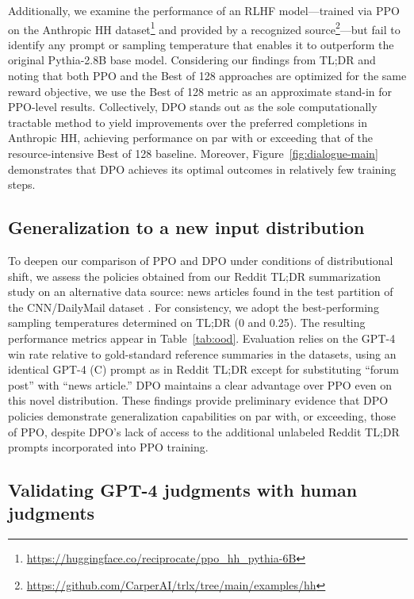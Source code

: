 Additionally, we examine the performance of an RLHF model—trained via PPO on the Anthropic HH dataset\footnote{\url{https://huggingface.co/reciprocate/ppo_hh_pythia-6B}} and provided by a recognized source\footnote{\url{https://github.com/CarperAI/trlx/tree/main/examples/hh}}—but fail to identify any prompt or sampling temperature that enables it to outperform the original Pythia-2.8B base model. Considering our findings from TL;DR and noting that both PPO and the Best of 128 approaches are optimized for the same reward objective, we use the Best of 128 metric as an approximate stand-in for PPO-level results. Collectively, DPO stands out as the sole computationally tractable method to yield improvements over the preferred completions in Anthropic HH, achieving performance on par with or exceeding that of the resource-intensive Best of 128 baseline. Moreover, Figure~\ref{fig:dialogue-main} demonstrates that DPO achieves its optimal outcomes in relatively few training steps.

\subsection{Generalization to a new input distribution}

To deepen our comparison of PPO and DPO under conditions of distributional shift, we assess the policies obtained from our Reddit TL;DR summarization study on an alternative data source: news articles found in the test partition of the CNN/DailyMail dataset \citep{nallapati-etal-2016-abstractive}. For consistency, we adopt the best-performing sampling temperatures determined on TL;DR (0 and 0.25). The resulting performance metrics appear in Table~\ref{tab:ood}. Evaluation relies on the GPT-4 win rate relative to gold-standard reference summaries in the datasets, using an identical GPT-4 (C) prompt as in Reddit TL;DR except for substituting “forum post” with “news article.” DPO maintains a clear advantage over PPO even on this novel distribution. These findings provide preliminary evidence that DPO policies demonstrate generalization capabilities on par with, or exceeding, those of PPO, despite DPO’s lack of access to the additional unlabeled Reddit TL;DR prompts incorporated into PPO training.

\subsection{Validating GPT-4 judgments with human judgments}
\label{sec:human-judgments}

